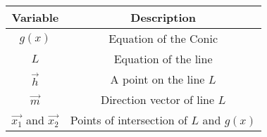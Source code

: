 \begin{tabular}{|c|c|}
\hline
\textbf{Variable} & \textbf{Description} \\
\hline
$g(x)$ & Equation of the Conic \\
\hline
$L$ & Equation of the line \\
\hline
$\vec{h}$ & A point on the line $L$ \\
\hline
$\vec{m}$ & Direction vector of line $L$ \\
\hline
$\vec{x_1}$ and $\vec{x_2}$ & Points of intersection of $L$ and $g(x)$ \\
\hline
\end{tabular}
